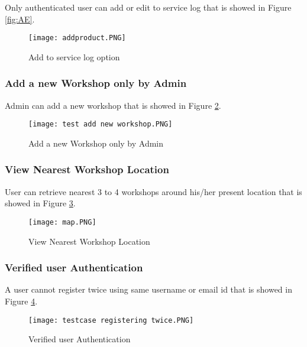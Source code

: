 \documentclass[11pt]{article} %
\begin{document}
    Only authenticated user can add or edit to service log that is showed in Figure \ref{fig:AE}.
	\begin{figure}[!hbt]
		\centering
        \texttt{[image: addproduct.PNG]} \par
        \caption{Add to service log option}
        \label{fig:ViewAdmin}
    \end{figure}
    \newpage
    \subsubsection{Add a new Workshop only by Admin}
    
    Admin can add a new workshop that is showed in Figure \ref{fig:AddW}.
    \begin{figure}[!hbt]
		\centering
        \texttt{[image: test add new workshop.PNG]} \par
        \caption{Add a new Workshop only by Admin}
        \label{fig:AddW}
    \end{figure}
    
    \subsubsection{View Nearest Workshop Location}
    User can retrieve nearest 3 to 4 workshops around his/her present location that is showed in Figure \ref{fig:VL}.
    
	\begin{figure}[!hbt]
		\centering
        \texttt{[image: map.PNG]} \par
        \caption{View Nearest Workshop Location}
        \label{fig:VL}
    \end{figure}
	\newpage
	\subsubsection{Verified user Authentication}
	A  user cannot register twice using same username or email id  that is showed in Figure \ref{fig:VUA}.
    \begin{figure}[!hbt]
		\centering
        \texttt{[image: testcase registering twice.PNG]} \par
        \caption{Verified user Authentication}
        \label{fig:VUA}
    \end{figure}
    
\end{document}
